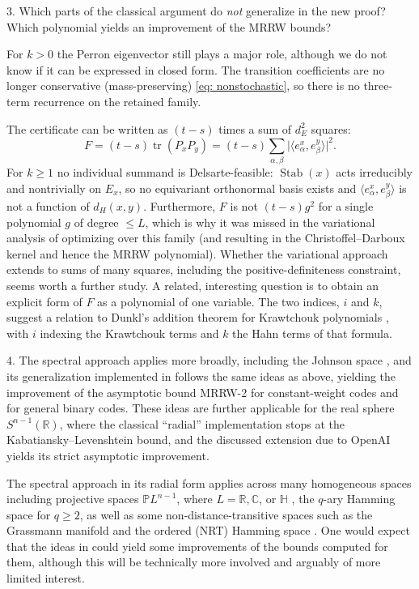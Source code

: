 \documentclass[11pt]{amsart}
\theoremstyle{plain}
\theoremstyle{remark}
\newcommand{\R}{\mathbb{R}}
\newcommand{\C}{\mathbb{C}}
\newcommand{\la}{\langle}
\newcommand{\ra}{\rangle}
\newcommand{\tr}{\operatorname{tr}}
\newcommand{\Stab}{\operatorname{Stab}}
\begin{document}
3.
Which parts of the classical argument do {\em not} generalize in the new proof? Which polynomial yields an improvement of the MRRW bounds? 

For $k>0$ the Perron eigenvector still plays a major role, although we do not know if it can be expressed in closed form. The transition coefficients are no longer conservative (mass-preserving) \eqref{eq: nonstochastic}, so there is no three-term recurrence on the retained family.

The certificate can be written as $(t-s)$ times a sum of $d_E^{2}$ squares:
\[
 F=(t-s)\tr(P_xP_y)=(t-s)\sum_{\alpha,\beta}
 \bigl|\la e^x_\alpha,e^y_\beta\ra\bigr|^{2}.
\]
 For $k\ge1$ no individual summand is Delsarte-feasible:
$\Stab(x)$ acts irreducibly and nontrivially on $E_x$, so no
equivariant orthonormal basis exists and $\la e^x_\alpha,e^y_\beta\ra$ is not a
function of $d_H(x,y)$. Furthermore, $F$ is not
$(t-s)g^{2}$ for a single polynomial $g$ of degree $\le L$, which is why it was missed 
in the variational analysis of \cite{BN08} optimizing over this family (and resulting in
the Christoffel--Darboux kernel and hence the MRRW polynomial). Whether the
variational approach extends to sums of many squares, including the
positive-definiteness constraint, seems worth a further study.
A related, interesting question is to obtain an explicit form of $F$ as a polynomial of one variable. The two indices, $i$ and $k$, suggest a relation to Dunkl's addition theorem for Krawtchouk polynomials \cite{Dunkl76}, with $i$ indexing the Krawtchouk terms and $k$ the Hahn terms of that formula.

4. 
The spectral approach applies more broadly, including the Johnson space \cite{BN06}, and its generalization implemented in \cite{OAI26} follows the same ideas as above, yielding the improvement of the asymptotic bound MRRW-2 for constant-weight codes and for general binary codes. These ideas are further applicable for the real sphere $S^{n-1}(\R)$, where the classical ``radial'' implementation stops at the Kabatiansky--Levenshtein bound, and the discussed extension due to OpenAI yields its strict asymptotic improvement.

The spectral approach in its radial form applies across many homogeneous spaces including projective spaces ${\mathbb P}L^{n-1}$, where $L=\R,  \C$, or $\mathbb H$ \cite{BN06}, the $q$-ary Hamming space for $q\ge 2$, as well as some non-distance-transitive spaces such as the Grassmann manifold \cite{Bachoc06} and the ordered (NRT) Hamming space  \cite{BP09}. One would expect that the ideas in \cite{OAI26} could yield some improvements of the bounds computed for them, although this will be technically more involved and arguably of more limited interest.
\end{document}
